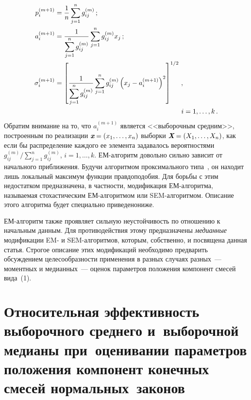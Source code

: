 \begin{multicols}{2}
\noindent
\begin{align}
p_i^{(m+1)}&=\fr{1}{n}\sum\limits_{j=1}^ng_{ij}^{(m)}\,;\notag \\
a_{i}^{(m+1)}      & = \fr{1}{\sum\limits_{j=1}^{n}g_{ij}^{(m)}}
\sum\limits_{j=1}^{n}g_{ij}^{(m)}x_{j}\,;    \\
\sigma_{i}^{(m+1)}  & =
 \left[ \fr{1}{\sum\limits_{j=1}^{n}g_{ij}^{(m)}}
\sum\limits_{j=1}^{n}g_{ij}^{(m)}\left(x_{j}-a_{i}^{(m+1)}\right)^2\right]^{1/2}\,,\notag\\\
&\ \ \ \ \ \ \ \ \  \ \ \ \ \ \ \ \ \ \ \ \ \ \ \ \ \ \ \ \ \ \ \ \ \ \ \ \  \ \ \ \ \ \ \ \ \ \ \ \ \ \ \ \ \ \ \
i=1,\ldots,k\,.\notag
\end{align}
Обратим внимание на то, что $a_{i}^{(m+1)}$ является <<выборочным
средним>>, построенным по реализации
$\emph{\textbf{x}}=(x_1,\ldots,x_n)$ выборки
$\emph{\textbf{X}}=(X_1,\ldots,X_n)$, как если бы распределение
каждого ее элемента задавалось вероятностями
$
g_{ij}^{(m)}/\sum\limits_{j=1}^{n}g_{ij}^{(m)}$, $i=1,\ldots,k$.
ЕМ-ал\-го\-ритм довольно сильно зависит от начального приближения.
Будучи алгоритмом проксимального типа~\cite{Korolev2007b, Vasilyev2002},
он находит лишь локальный максимум функции
правдоподобия. Для борьбы с этим недостатком предназначена, в
частности, модификация ЕМ-алгоритма, называемая стохастическим
ЕМ-алгоритмом или SEM-алгоритмом. Описание этого алгоритма будет
специально приведено\linebreak ниже.

ЕМ-алгоритм также проявляет сильную неустойчивость по отношению к
начальным данным. Для противодействия этому предназначены {\it
медианные} модификации EM- и SEM-алгоритмов, которым, собственно,
и посвящена данная статья. Строгое описание этих модификаций
необходимо предварить обсуждением целесообразности применения в
разных случаях разных~--- моментных и медианных~--- оценок
параметров положения компонент смесей вида~(1).

\section{Относительная эффективность выборочного среднего и~выборочной
медианы при~оценивании параметров положения компонент конечных смесей нормальных~законов}

\label{efficency}


\end{multicols}
